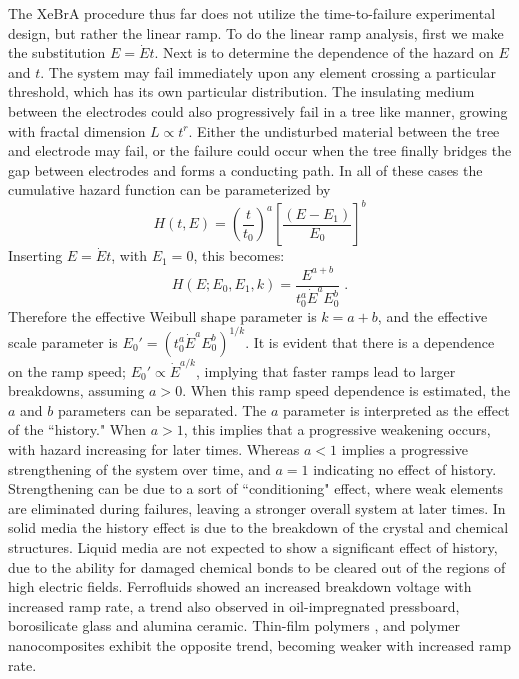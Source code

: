 The XeBrA procedure thus far does not utilize the time-to-failure experimental design, but rather the linear ramp.
To do the linear ramp analysis, first we make the substitution $E= \dot{E}t$.
Next is to determine the dependence of the hazard on $E$ and $t$.
The system may fail immediately upon any element crossing a particular threshold, which has its own particular distribution\cite{hill_examination_1983}.
The insulating medium between the electrodes could also progressively fail in a tree like manner, growing with fractal dimension $L\propto t^{r}$.
Either the undisturbed material between the tree and electrode may fail, or the failure could occur when the tree finally bridges the gap between electrodes and forms a conducting path.
In all of these cases the cumulative hazard function can be parameterized by 
\begin{equation}
    H(t,E) =  (\frac{t}{t_0})^a [\frac{(E -E_1)}{E_0}]^b
\end{equation}
\noindent
Inserting $E=\dot{E}t$, with $E_1=0$, this becomes:
\begin{equation}
    H(E;E_0, E_1,k) =  \frac{E^{a+b}}{t_0^a\dot{E}^aE_0^b}\;.
\end{equation}
\noindent
Therefore the effective Weibull shape parameter is $k=a+b$, and the effective scale parameter is $E_0'=(t_0^a\dot{E}^aE_0^b)^{1/k}$.
It is evident that there is a dependence on the ramp speed; $E_0'\propto \dot{E}^{a/k}$, implying that faster ramps lead to larger breakdowns, assuming $a>0$.
When this ramp speed dependence is estimated, the $a$ and $b$ parameters can be separated.
The $a$ parameter is interpreted as the effect of the ``history." 
When $a>1$, this implies that a progressive weakening occurs, with hazard increasing for later times.
Whereas $a<1$ implies a progressive strengthening of the system over time, and $a=1$ indicating no effect of history.
Strengthening can be due to a sort of ``conditioning" effect, where weak elements are eliminated during failures, leaving a stronger overall system at later times.
In solid media the history effect is due to the breakdown of the crystal and chemical structures.
Liquid media are not expected to show a significant effect of history, due to the ability for damaged chemical bonds to be cleared out of the regions of high electric fields.
Ferrofluids showed an increased breakdown voltage with increased ramp rate\cite{bartko_effect_2020}, a trend also observed in oil-impregnated pressboard\cite{nedjar_weibull_2013}, borosilicate glass \cite{fischer_influence_2021} and alumina ceramic\cite{mieller_influence_2019}.
Thin-film polymers \cite{thomas_effect_2006}, and polymer nanocomposites\cite{nedjar_weibull_2013} exhibit the opposite trend, becoming weaker with increased ramp rate.


